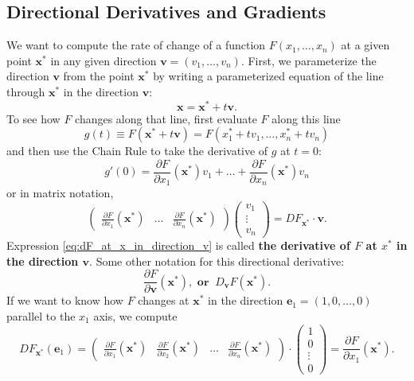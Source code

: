 \documentclass[10pt,a4paper]{book}
\theoremstyle{definition}\newtheorem{definition}{Definition}
\theoremstyle{definition}\newtheorem{fact}{Fact}
\theoremstyle{definition}\newtheorem{ex}{Ex.}
\theoremstyle{definition}\newtheorem{project}{Project}
\theoremstyle{definition}\newtheorem{problem}{Problem}
\theoremstyle{definition}\newtheorem{example}{Example}
\numberwithin{theorem}{chapter}
\numberwithin{corollary}{chapter}
\numberwithin{assumption}{chapter}
\numberwithin{definition}{chapter}
\numberwithin{prop}{chapter}
\numberwithin{notation}{chapter}
\numberwithin{problem}{chapter}
\numberwithin{example}{chapter}
\numberwithin{fact}{chapter}
\numberwithin{ex}{chapter}
\def\e{\mathbf e}
\def\v{\mathbf v}
\def\x{\mathbf x}
\begin{document}
	\subsection{Directional Derivatives and Gradients}
	We want to compute the rate of change of a function $F(x_1, \dots, x_n)$ at a given point $\x^*$ in any given direction $\v = (v_1, \dots, v_n)$. First, we parameterize the direction $\v$ from the point $\x^*$ by writing a parameterized equation of the line through $\x^*$ in the direction $\v$:
	\begin{equation*}
		\x = \x^* + t\v.
	\end{equation*}
	To see how $F$ changes along that line, first evaluate $F$ along this line
	\begin{equation*}
		g(t) \equiv F(\x^* + t\v) = F(x^*_1 + tv_1, \dots, x^*_n + t v_n)
	\end{equation*}
	and then use the Chain Rule to take the derivative of $g$ at $t=0$:
	\begin{equation*}
		g'(0) = \frac{\partial F}{\partial x_1} (\x^*) v_1  + \dots + \frac{\partial F}{\partial x_n} (\x^*) v_n
	\end{equation*}
	or in matrix notation,
	\begin{equation}
		\label{eq:dF_at_x_in_direction_v}
		\begin{pmatrix}
			\frac{\partial F}{\partial x_1}(\x^*) & \dots & \frac{\partial F}{\partial x_n}(\x^*) 
		\end{pmatrix}
		\begin{pmatrix}
			v_1    \\
			\vdots \\
			v_n    
		\end{pmatrix}
		= DF_{\x^*} \cdot \v.
	\end{equation}
	Expression \ref{eq:dF_at_x_in_direction_v} is called \textbf{the derivative of $F$ at $x^*$ in the direction $\v$}. Some other notation for this directional derivative:
	\begin{equation*}
		\frac{\partial F}{\partial \v}(\x^*), \textbf{ or } \ D_{\v} F(\x^*).
	\end{equation*} 
	If we want to know how $F$ changes at $\x^*$ in the direction $\e_1=(1,0,\dots,0)$ parallel to the $x_1$ axis, we compute
	\begin{equation*}
		DF_{\x^*} (\e_1) = 
		\begin{pmatrix}
			\frac{\partial F}{\partial x_1}(\x^*) & \frac{\partial F}{\partial x_2}(\x^*) & \dots & \frac{\partial F}{\partial x_n}(\x^*) 
		\end{pmatrix}
		\cdot
		\begin{pmatrix}
			1      \\
			0      \\
			\vdots \\ 
			0      
		\end{pmatrix}
		= \frac{\partial F}{\partial x_1}(\x^*).
	\end{equation*}
	
\end{document}
